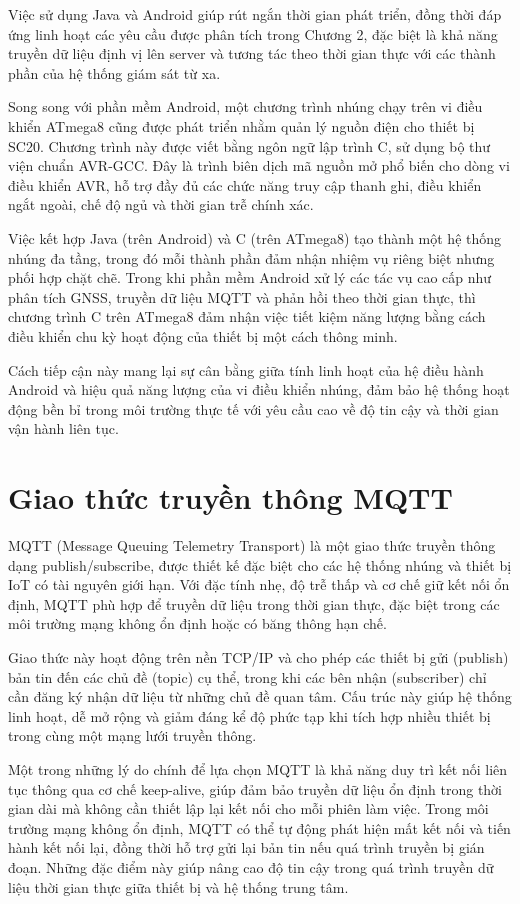 \documentclass[../DoAn.tex]{subfiles}
\begin{document}
Việc sử dụng Java và Android giúp rút ngắn thời gian phát triển, đồng thời đáp ứng linh hoạt các yêu cầu được phân tích trong Chương 2, đặc biệt là khả năng truyền dữ liệu định vị lên server và tương tác theo thời gian thực với các thành phần của hệ thống giám sát từ xa.

Song song với phần mềm Android, một chương trình nhúng chạy trên vi điều khiển ATmega8 cũng được phát triển nhằm quản lý nguồn điện cho thiết bị SC20. Chương trình này được viết bằng ngôn ngữ lập trình C, sử dụng bộ thư viện chuẩn AVR-GCC. Đây là trình biên dịch mã nguồn mở phổ biến cho dòng vi điều khiển AVR, hỗ trợ đầy đủ các chức năng truy cập thanh ghi, điều khiển ngắt ngoài, chế độ ngủ và thời gian trễ chính xác.

Việc kết hợp Java (trên Android) và C (trên ATmega8) tạo thành một hệ thống nhúng đa tầng, trong đó mỗi thành phần đảm nhận nhiệm vụ riêng biệt nhưng phối hợp chặt chẽ. Trong khi phần mềm Android xử lý các tác vụ cao cấp như phân tích GNSS, truyền dữ liệu MQTT và phản hồi theo thời gian thực, thì chương trình C trên ATmega8 đảm nhận việc tiết kiệm năng lượng bằng cách điều khiển chu kỳ hoạt động của thiết bị một cách thông minh.

Cách tiếp cận này mang lại sự cân bằng giữa tính linh hoạt của hệ điều hành Android và hiệu quả năng lượng của vi điều khiển nhúng, đảm bảo hệ thống hoạt động bền bỉ trong môi trường thực tế với yêu cầu cao về độ tin cậy và thời gian vận hành liên tục.

\section{Giao thức truyền thông MQTT}
\label{section:3.3}
MQTT (Message Queuing Telemetry Transport) là một giao thức truyền thông dạng publish/subscribe, được thiết kế đặc biệt cho các hệ thống nhúng và thiết bị IoT có tài nguyên giới hạn. Với đặc tính nhẹ, độ trễ thấp và cơ chế giữ kết nối ổn định, MQTT phù hợp để truyền dữ liệu trong thời gian thực, đặc biệt trong các môi trường mạng không ổn định hoặc có băng thông hạn chế.

Giao thức này hoạt động trên nền TCP/IP và cho phép các thiết bị gửi (publish) bản tin đến các chủ đề (topic) cụ thể, trong khi các bên nhận (subscriber) chỉ cần đăng ký nhận dữ liệu từ những chủ đề quan tâm. Cấu trúc này giúp hệ thống linh hoạt, dễ mở rộng và giảm đáng kể độ phức tạp khi tích hợp nhiều thiết bị trong cùng một mạng lưới truyền thông.

Một trong những lý do chính để lựa chọn MQTT là khả năng duy trì kết nối liên tục thông qua cơ chế keep-alive, giúp đảm bảo truyền dữ liệu ổn định trong thời gian dài mà không cần thiết lập lại kết nối cho mỗi phiên làm việc. Trong môi trường mạng không ổn định, MQTT có thể tự động phát hiện mất kết nối và tiến hành kết nối lại, đồng thời hỗ trợ gửi lại bản tin nếu quá trình truyền bị gián đoạn. Những đặc điểm này giúp nâng cao độ tin cậy trong quá trình truyền dữ liệu thời gian thực giữa thiết bị và hệ thống trung tâm.
\end{document}

